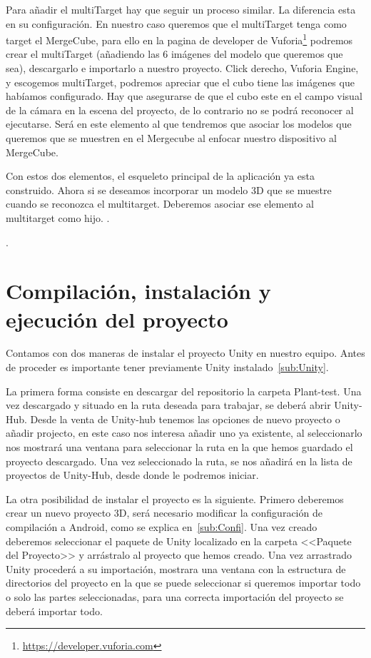 Para añadir el multiTarget hay que seguir un proceso similar. La diferencia esta en su configuración. En nuestro caso queremos que el multiTarget tenga como target el MergeCube, para ello en la pagina de developer de Vuforia\footnote{\url{https://developer.vuforia.com}} podremos crear el multiTarget (añadiendo las 6 imágenes del modelo que queremos que sea), descargarlo e importarlo a nuestro proyecto. 
Click derecho, Vuforia Engine, y escogemos multiTarget, podremos apreciar que el cubo tiene las imágenes que habíamos configurado. Hay que asegurarse de que el cubo este en el campo visual de la cámara en la escena del proyecto, de lo contrario no se podrá reconocer al ejecutarse. Será en este elemento al que tendremos que asociar los modelos que queremos que se muestren en el Mergecube al enfocar nuestro dispositivo al MergeCube.


Con estos dos elementos, el esqueleto principal de la aplicación ya esta construido. Ahora si se deseamos incorporar un modelo 3D que se muestre cuando se reconozca el multitarget. Deberemos asociar ese elemento al multitarget como hijo.
.

.



\section{Compilación, instalación y ejecución del proyecto}
Contamos con dos maneras de instalar el proyecto Unity en nuestro equipo. Antes de proceder es importante tener previamente Unity instalado~\ref{sub:Unity}.


La primera forma consiste en descargar del repositorio la carpeta Plant-test. Una vez descargado y situado en la ruta deseada para trabajar, se deberá abrir Unity-Hub. Desde la venta de Unity-hub tenemos las opciones de nuevo proyecto o añadir projecto, en este caso nos interesa añadir uno ya existente, al seleccionarlo nos mostrará una ventana para seleccionar la ruta en la que hemos guardado el proyecto descargado. Una vez seleccionado la ruta, se nos añadirá en la lista de proyectos de Unity-Hub, desde donde le podremos iniciar. 


La otra posibilidad de instalar el proyecto es la siguiente. Primero deberemos crear un nuevo proyecto 3D, será necesario modificar la configuración de compilación a Android, como se explica en~\ref{sub:Confi}. Una vez creado deberemos seleccionar el paquete de Unity localizado en la carpeta <<Paquete del Proyecto>> y arrástralo al proyecto que hemos creado. Una vez arrastrado Unity procederá a su importación, mostrara una ventana con la estructura de directorios del proyecto en la que se puede seleccionar si queremos importar todo o solo las partes seleccionadas, para una correcta importación del proyecto se deberá importar todo.


